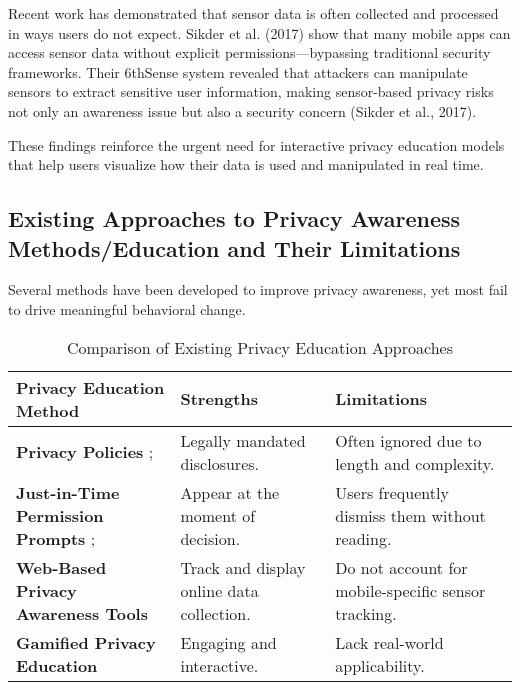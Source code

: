 \documentclass[acmlarge, nonacm]{acmart}
\begin{document}
Recent work has demonstrated that sensor data is often collected and processed in ways users do not expect. Sikder et al. (2017) show that many mobile apps can access sensor data without explicit permissions—bypassing traditional security frameworks. Their 6thSense system revealed that attackers can manipulate sensors to extract sensitive user information, making sensor-based privacy risks not only an awareness issue but also a security concern (Sikder et al., 2017).

These findings reinforce the urgent need for interactive privacy education models that help users visualize how their data is used and manipulated in real time.

\subsection{Existing Approaches to Privacy Awareness Methods/Education and Their Limitations}

Several methods have been developed to improve privacy awareness, yet most fail to drive meaningful behavioral change.

\begin{table}[ht]
    \centering
    \begin{tabular}{|p{6cm}|p{4cm}|p{4cm}|}
        \hline
        \textbf{Privacy Education Method} & \textbf{Strengths} & \textbf{Limitations} \\  
        \hline
        \textbf{Privacy Policies} \cite{Obar2018The}; \cite{Korunovska2020TheCA} & Legally mandated disclosures. & Often ignored due to length and complexity. \\  
        \hline
        \textbf{Just-in-Time Permission Prompts} \cite{Gruber2022Towards};\cite{Park2023Understanding} & Appear at the moment of decision. & Users frequently dismiss them without reading. \\  
        \hline
        \textbf{Web-Based Privacy Awareness Tools} \cite{Hasrama2024Exploring} & Track and display online data collection. & Do not account for mobile-specific sensor tracking. \\  
        \hline
        \textbf{Gamified Privacy Education} \cite{Gerber2018Explaining} & Engaging and interactive. & Lack real-world applicability. \\  
        \hline
    \end{tabular}
    \caption{Comparison of Existing Privacy Education Approaches}
    \label{tab:privacy_education}
\end{table}
\end{document}
